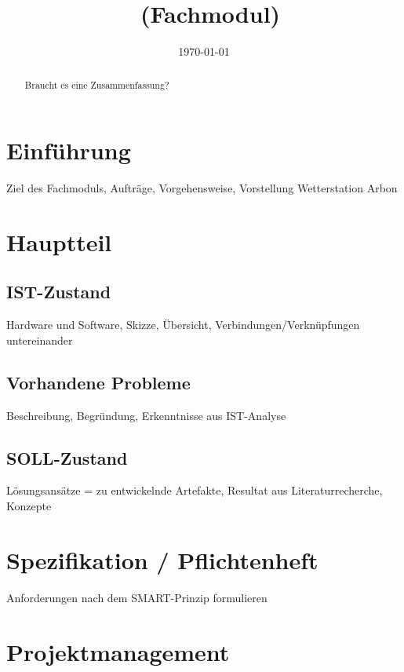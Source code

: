 \documentclass[a4paper,ngerman, 12pt]{report}
\title{\projektName~(Fachmodul)}
\author{\authorName}
\date{\today}
\begin{document}

\setcounter{page}{2}
\tableofcontents          
\clearpage
{}


\begin{abstract}
Braucht es eine Zusammenfassung?
\end{abstract}


\chapter{Einführung}
Ziel des Fachmoduls, Aufträge, Vorgehensweise, Vorstellung Wetterstation Arbon


\chapter{Hauptteil}

\section{IST-Zustand}
Hardware und Software, 
Skizze, 
Übersicht, 
Verbindungen/Verknüpfungen untereinander

\section{Vorhandene Probleme}
Beschreibung, 
Begründung, 
Erkenntnisse aus IST-Analyse

\section{SOLL-Zustand}
Lösungsansätze = zu entwickelnde Artefakte, 
Resultat aus Literaturrecherche, 
Konzepte


\chapter{Spezifikation / Pflichtenheft}
Anforderungen nach dem SMART-Prinzip formulieren
   


\chapter{Projektmanagement}
\end{document}
